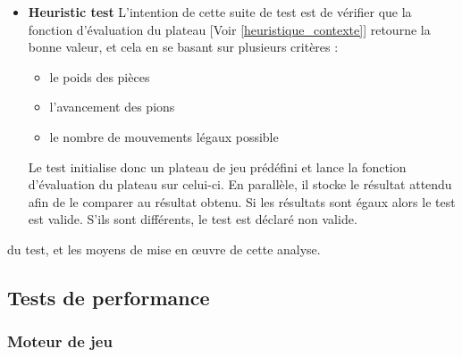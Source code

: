 \documentclass{article}
\begin{document}
\begin{itemize}
    \newpage
    \item \textbf{Heuristic test}\newline
    L'intention de cette suite de test est de vérifier que la fonction d'évaluation du plateau [Voir \ref{heuristique_contexte}]
    retourne la bonne valeur, et cela en se basant sur plusieurs critères : 
    \begin{itemize}
        \item le poids des pièces
        \item l'avancement des pions
        \item le nombre de mouvements légaux possible
    \end{itemize}
    Le test initialise donc un plateau de jeu prédéfini et lance la fonction d'évaluation du plateau sur celui-ci.\newline
    En parallèle, il stocke le résultat attendu afin de le comparer au résultat obtenu.\newline
    Si les résultats sont égaux alors le test est valide.
    S'ils sont différents, le test est déclaré non valide.
    
    
    
    
    
    
    
\end{itemize}
du test, et les moyens de mise en œuvre de cette analyse.
\subsection{Tests de performance}
\subsubsection{Moteur de jeu}
\end{document}
